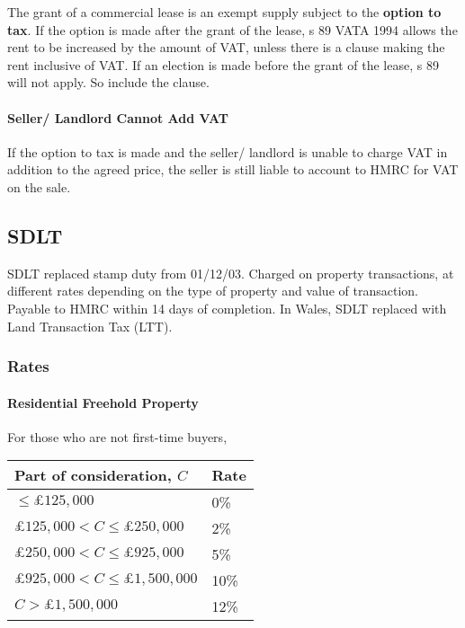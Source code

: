 \documentclass[
]{article}
\begin{document}
The grant of a commercial lease is an exempt supply subject to the
\textbf{option to tax}. If the option is made after the grant of the
lease, s 89 VATA 1994 allows the rent to be increased by the amount of
VAT, unless there is a clause making the rent inclusive of VAT. If an
election is made before the grant of the lease, s 89 will not apply. So
include the clause.

\hypertarget{seller-landlord-cannot-add-vat}{%
\paragraph{Seller/ Landlord Cannot Add
VAT}\label{seller-landlord-cannot-add-vat}}

If the option to tax is made and the seller/ landlord is unable to
charge VAT in addition to the agreed price, the seller is still liable
to account to HMRC for VAT on the sale.

\hypertarget{sdlt}{%
\subsection{SDLT}\label{sdlt}}

SDLT replaced stamp duty from 01/12/03. Charged on property
transactions, at different rates depending on the type of property and
value of transaction. Payable to HMRC within 14 days of completion. In
Wales, SDLT replaced with Land Transaction Tax (LTT).

\hypertarget{rates}{%
\subsubsection{Rates}\label{rates}}

\hypertarget{residential-freehold-property}{%
\paragraph{Residential Freehold
Property}\label{residential-freehold-property}}

For those who are not first-time buyers,

\begin{longtable}[]{@{}ll@{}}
\toprule()
Part of consideration, \(C\) & Rate \\
\midrule()
\endhead
\(\leq £125,000\) & 0\% \\
\(£125,000 < C \leq £250,000\) & 2\% \\
\(£250,000 < C \leq £925,000\) & 5\% \\
\(£925,000 < C \leq £1,500,000\) & 10\% \\
\(C > £1,500,000\) & 12\% \\
\bottomrule()
\end{longtable}
\end{document}
